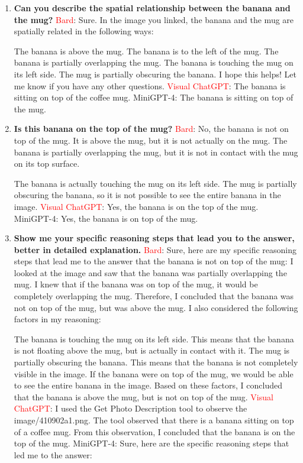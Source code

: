     \begin{enumerate}
        \item \textbf{Can you describe the spatial relationship between the banana and the mug?}
        \subitem \textcolor{Red}{Bard}: Sure. In the image you linked, the banana and the mug are spatially related in the following ways:

        The banana is above the mug.
        The banana is to the left of the mug.
        The banana is partially overlapping the mug.
        The banana is touching the mug on its left side.
        The mug is partially obscuring the banana.
        I hope this helps! Let me know if you have any other questions.
        \subitem \textcolor{red}{Visual ChatGPT}: The banana is sitting on top of the coffee mug.
        \subitem MiniGPT-4: The banana is sitting on top of the mug.
        \item \textbf{Is this banana on the top of the mug?}
        \subitem \textcolor{Red}{Bard}: 
        No, the banana is not on top of the mug. It is above the mug, but it is not actually on the mug. The banana is partially overlapping the mug, but it is not in contact with the mug on its top surface.
        
        The banana is actually touching the mug on its left side. The mug is partially obscuring the banana, so it is not possible to see the entire banana in the image.
        \subitem \textcolor{red}{Visual ChatGPT}: Yes, the banana is on the top of the mug.
        \subitem MiniGPT-4: Yes, the banana is on top of the mug.
        \item \textbf{Show me your specific reasoning steps that lead you to the answer, better in detailed explanation.}
        \subitem \textcolor{Red}{Bard}: 
        Sure, here are my specific reasoning steps that lead me to the answer that the banana is not on top of the mug:
        I looked at the image and saw that the banana was partially overlapping the mug.
        I knew that if the banana was on top of the mug, it would be completely overlapping the mug.
        Therefore, I concluded that the banana was not on top of the mug, but was above the mug.
        I also considered the following factors in my reasoning:

        The banana is touching the mug on its left side. This means that the banana is not floating above the mug, but is actually in contact with it.
        The mug is partially obscuring the banana. This means that the banana is not completely visible in the image. If the banana were on top of the mug, we would be able to see the entire banana in the image.
        Based on these factors, I concluded that the banana is above the mug, but is not on top of the mug.
        \subitem \textcolor{red}{Visual ChatGPT}: I used the Get Photo Description tool to observe the image/410902a1.png. The tool observed that there is a banana sitting on top of a coffee mug. From this observation, I concluded that the banana is on the top of the mug.
        \subitem MiniGPT-4: Sure, here are the specific reasoning steps that led me to the answer:


\end{enumerate}
